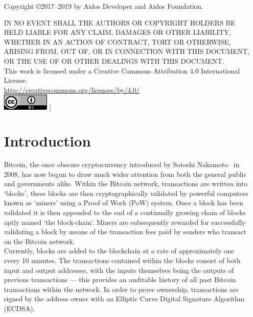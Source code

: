 \documentclass[a4paper,10pt,twocolumn]{article}
\begin{document}
			\vspace{1.5cm}
	
	\footnotesize
	Copyright \copyright2017--2019 by Aidos Developer and Aidos Foundation.
	
	\vspace{2mm}
		
	IN NO EVENT SHALL THE AUTHORS OR COPYRIGHT HOLDERS BE HELD LIABLE FOR ANY CLAIM, DAMAGES OR OTHER
	LIABILITY, WHETHER IN AN ACTION OF CONTRACT, TORT OR OTHERWISE, ARISING FROM,
	OUT OF, OR IN CONNECTION WITH THIS DOCUMENT, OR THE USE OF OR OTHER DEALINGS WITH
	THIS DOCUMENT\@.\\
	
	This work is licensed under a Creative Commons Attribution 4.0 International License. \\
	\url{http://creativecommons.org/licenses/by/4.0/} \\
	\includegraphics{cc}
	]
	
	\normalsize
	\twocolumn[
	\tableofcontents
	\listoffigures
	]
	
	\clearpage
	
	\section{Introduction}
	Bitcoin, the once obscure cryptocurrency introduced by Satoshi Nakamoto~\cite{btc} in 2008, has now begun to draw much wider attention 
	from both the general public and governments alike. Within the Bitcoin network, transactions are written into `blocks', these blocks 
	are then cryptographically validated by powerful computers known as `miners' using a Proof of Work (PoW) system. Once a block has been 
	validated it is then appended to the end of a continually growing chain of blocks aptly named `the block-chain'. Miners are 
	subsequently rewarded for successfully validating a block by means of the transaction fees paid by senders who transact on the Bitcoin 
	network.\\
	
	Currently, blocks are added to the blockchain at a rate of approximately one every 10 minutes. The transactions contained within the
	blocks consist of both input and output addresses, with the inputs themselves being the outputs of previous transactions --- this 
	provides an auditable history of all past Bitcoin transactions within the network. In order to prove ownership, transactions are signed 
	by the address owner with an Elliptic Curve Digital Signature Algorithm (ECDSA).\\
	
\end{document}
